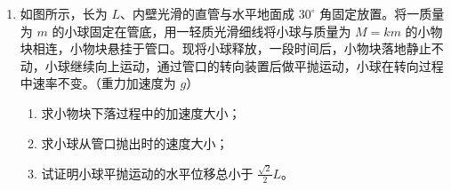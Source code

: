 \documentclass[\gkver]{gaokaozhenti}
\begin{document}
\begin{enumerate}
\begin{enumerate}
	\item
	请写出原线圈输入电压瞬时值 $u_{ab}$ 的表达式；
	\item
	求只在 ce 间接 $400\UO$ 的电阻时，原线圈中的电流 $I_{1}$；
	\item
	求 ce 和 de 间线圈的匝数比。
\end{enumerate}



\item
如图所示，长为 $L$、内壁光滑的直管与水平地面成 $30^{\circ}$ 角固定放置。将一质量为 $m$ 的小球固定在管底，用一轻质光滑细线将小球与质量为 $M=km$ 的小物块相连，小物块悬挂于管口。现将小球释放，一段时间后，小物块落地静止不动，小球继续向上运动，通过管口的转向装置后做平抛运动，小球在转向过程中速率不变。（重力加速度为 $g$）

\begin{enumerate}
	\item
	求小物块下落过程中的加速度大小；
	\item
	求小球从管口抛出时的速度大小；
	\item
	试证明小球平抛运动的水平位移总小于 $\frac{\sqrt{2}}{2}L$。
\end{enumerate}


\end{enumerate}
\end{document}
